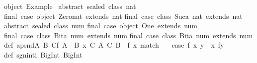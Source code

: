 \begin{isabellebody}
\isamarkuptrue%
%
\isadeliminvisible
%
\endisadeliminvisible
%
\isataginvisible
%
\endisataginvisible
{\isafoldinvisible}%
%
\isadeliminvisible
%
\endisadeliminvisible
%
\isadelimquotetypewriter
%
\endisadelimquotetypewriter
%
\isatagquotetypewriter
%
\begin{isamarkuptext}%
object\ Example\ {}\isanewline
\isanewline
abstract\ sealed\ class\ nat\isanewline
final\ case\ object\ Zero{}nat\ extends\ nat\isanewline
final\ case\ class\ Suc{}a{}\ nat{}\ extends\ nat\isanewline
\isanewline
abstract\ sealed\ class\ num\isanewline
final\ case\ object\ One\ extends\ num\isanewline
final\ case\ class\ Bit{}{}a{}\ num{}\ extends\ num\isanewline
final\ case\ class\ Bit{}{}a{}\ num{}\ extends\ num\isanewline
\isanewline
def\ apsnd{}A{}\ B{}\ C{}{}f{}\ A\ {}{}\ B{}\ x{}{}\ {}C{}\ A{}{}{}\ {}C{}\ B{}\ {}\ {}f{}\ x{}{}\ match\ {}\isanewline
\ \ case\ {}f{}\ {}x{}\ y{}{}\ {}{}\ {}x{}\ f{}y{}{}\isanewline
{}\isanewline
\isanewline
def\ sgn{}int{}i{}\ BigInt{}{}\ BigInt\ {}\isanewline

\end{isamarkuptext}
\end{isabellebody}
